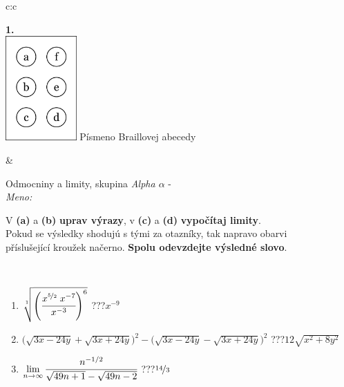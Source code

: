 \documentclass[10pt]{report}
\begin{document}
\begin{tabular}{c:c}
\begin{minipage}[c][104.5mm][t]{0.5\linewidth}
\begin{center}
\begin{minipage}{0.20\linewidth}
\begin{center}
{\Huge\bfseries 1.} \\[2mm]
\includegraphics[height=40mm]{../images/braille.png}
{\small Písmeno Braillovej abecedy}
\end{center}
\end{minipage}
\end{center}
\end{minipage}
&
\begin{minipage}[c][104.5mm][t]{0.5\linewidth}
\begin{center}
\vspace{7mm}
{\huge Odmocniny a limity, skupina \textit{Alpha $\alpha$} -}\\[5mm]
\textit{Meno:}\phantom{xxxxxxxxxxxxxxxxxxxxxxxxxxxxxxxxxxxxxxxxxxxxxxxxxxxxxxxxxxxxxxxxx}\\[5mm]
\begin{minipage}{0.95\linewidth}
\begin{center}
V \textbf{(a)} a \textbf{(b)} \textbf{uprav výrazy}, v \textbf{(c)} a \textbf{(d)} \textbf{vypočítaj limity}.\\Pokud se výsledky shodujú s tými za otazníky, tak napravo obarvi\\příslušející kroužek načerno. \textbf{Spolu odevzdejte výsledné slovo}.
\end{center}
\end{minipage}
\\[1mm]
\begin{minipage}{0.79\linewidth}
\begin{center}
\begin{varwidth}{\linewidth}
\begin{enumerate}
\small
\item $\sqrt[1]{\left(\cfrac{x^{\nicefrac{5}{2}}\;x^{-7}}{x^{-3}}\right)^{6}}$\quad \dotfill\; ???\;\dotfill \quad $x^{-9}$
\item {\footnotesize{\scriptsize$\big(\sqrt{3x-24y}+\sqrt{3x+24y}\big)^2-\big(\sqrt{3x-24y}-\sqrt{3x+24y}\big)^2$}\quad \dotfill\; ???\;\dotfill \quad $12\sqrt{x^2+8y^2}$}
\item $\lim\limits_{n\to\infty}\cfrac{n^{-1/2}}{\sqrt{49n+1}-\sqrt{49n-2}}$\quad \dotfill\; ???\;\dotfill \quad $\nicefrac{14}{3}$

\end{enumerate}
\end{varwidth}
\end{center}
\end{minipage}
\end{center}
\end{minipage}
\end{tabular}
\end{document}
